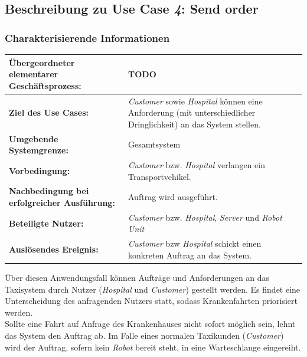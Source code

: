 		\pagebreak

		\subsection{Beschreibung zu Use Case \emph{4}: Send order}
		
		
		\subsubsection*{Charakterisierende Informationen}
		
		\begin{table}[H]
			\centering
			\begin{tabularx}{\textwidth}{|p{5cm}|X|}
				\hline
				\textbf{Übergeordneter elementarer Geschäftsprozess:} & TODO  \\ \hline
				\textbf{Ziel des Use Cases:} & \emph{Customer} sowie \emph{Hospital} können eine Anforderung (mit unterschiedlicher Dringlichkeit) an das System stellen. \\ \hline
				\textbf{Umgebende Systemgrenze:} & Gesamtsystem \\ \hline
				\textbf{Vorbedingung:} & \emph{Customer} bzw. \emph{Hospital} verlangen ein Transportvehikel. \\ \hline
				\textbf{Nachbedingung bei erfolgreicher Ausführung:} & Auftrag wird ausgeführt. \\ \hline
				\textbf{Beteiligte Nutzer:} & \emph{Customer} bzw. \emph{Hospital}, \emph{Server} und \emph{Robot Unit} \\ \hline
				\textbf{Auslösendes Ereignis:} & \emph{Customer} bzw \emph{Hospital} schickt einen konkreten Auftrag an das System. \\
				\hline
			\end{tabularx}
		\end{table}
		
		Über diesen Anwendungsfall können Aufträge und Anforderungen an das Taxisystem durch Nutzer (\emph{Hospital} und \emph{Customer}) gestellt werden.
		Es findet eine Unterscheidung des anfragenden Nutzers statt, sodass Krankenfahrten priorisiert werden. \\ Sollte eine Fahrt auf Anfrage des Krankenhauses nicht sofort möglich sein, lehnt das System den Auftrag ab. Im Falle eines normalen Taxikunden (\emph{Customer}) wird der Auftrag, sofern kein \emph{Robot} bereit steht, in eine Warteschlange eingereiht.
		
		
